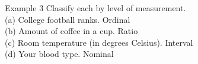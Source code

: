 \documentclass[t]{beamer}
\begin{document}
\begin{frame}{Example 3}
Classify each by level of measurement.	\newline\\
(a) \quad College football ranks. 	\quad \pause Ordinal \newline\\ \pause
(b) \quad Amount of coffee in a cup. \quad \pause Ratio \newline\\ \pause
(c) \quad Room temperature (in degrees Celsius). \quad \pause Interval \newline\\ \pause
(d) \quad Your blood type. \quad \pause Nominal
\end{frame}
\end{document}
